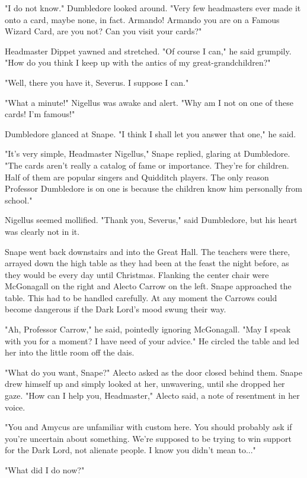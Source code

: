 \documentclass[a4paper,11pt]{article}
\begin{document}
"I do not know." Dumbledore looked around. "Very few headmasters ever made it onto a card, maybe none, in fact. Armando! Armando you are on a Famous Wizard Card, are you not? Can you visit your cards?"

Headmaster Dippet yawned and stretched. "Of course I can," he said grumpily. "How do you think I keep up with the antics of my great-grandchildren?"

"Well, there you have it, Severus. I suppose I can."

"What a minute!" Nigellus was awake and alert. "Why am I not on one of these cards! I'm famous!"

Dumbledore glanced at Snape. "I think I shall let you answer that one," he said.

"It's very simple, Headmaster Nigellus," Snape replied, glaring at Dumbledore. "The cards aren't really a catalog of fame or importance. They're for children. Half of them are popular singers and Quidditch players. The only reason Professor Dumbledore is on one is because the children know him personally from school."

Nigellus seemed mollified. "Thank you, Severus," said Dumbledore, but his heart was clearly not in it.

Snape went back downstairs and into the Great Hall. The teachers were there, arrayed down the high table as they had been at the feast the night before, as they would be every day until Christmas. Flanking the center chair were McGonagall on the right and Alecto Carrow on the left. Snape approached the table. This had to be handled carefully. At any moment the Carrows could become dangerous if the Dark Lord's mood swung their way.

"Ah, Professor Carrow," he said, pointedly ignoring McGonagall. "May I speak with you for a moment? I have need of your advice." He circled the table and led her into the little room off the dais.

"What do you want, Snape?" Alecto asked as the door closed behind them. Snape drew himself up and simply looked at her, unwavering, until she dropped her gaze. "How can I help you, Headmaster," Alecto said, a note of resentment in her voice.

"You and Amycus are unfamiliar with custom here. You should probably ask if you're uncertain about something. We're supposed to be trying to win support for the Dark Lord, not alienate people. I know you didn't mean to..."

"What did I do now?"
\end{document}
